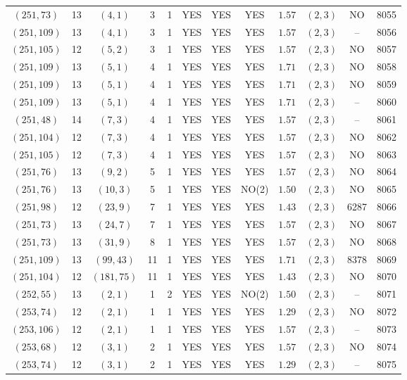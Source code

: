 \begin{longtable}{|c|c|c|c|c|c|c|c|c|c|c|c|}
$(251,73)$ & 13 & $(4,1)$ & 3 & 1 & YES & YES & YES & $1.57$ & $(2,3)$ & NO & 8055\\
$(251,109)$ & 13 & $(4,1)$ & 3 & 1 & YES & YES & YES & $1.57$ & $(2,3)$ & -- & 8056\\
$(251,105)$ & 12 & $(5,2)$ & 3 & 1 & YES & YES & YES & $1.57$ & $(2,3)$ & NO & 8057\\
$(251,109)$ & 13 & $(5,1)$ & 4 & 1 & YES & YES & YES & $1.71$ & $(2,3)$ & NO & 8058\\
$(251,109)$ & 13 & $(5,1)$ & 4 & 1 & YES & YES & YES & $1.71$ & $(2,3)$ & NO & 8059\\
$(251,109)$ & 13 & $(5,1)$ & 4 & 1 & YES & YES & YES & $1.71$ & $(2,3)$ & -- & 8060\\
$(251,48)$ & 14 & $(7,3)$ & 4 & 1 & YES & YES & YES & $1.57$ & $(2,3)$ & -- & 8061\\
$(251,104)$ & 12 & $(7,3)$ & 4 & 1 & YES & YES & YES & $1.57$ & $(2,3)$ & NO & 8062\\
$(251,105)$ & 12 & $(7,3)$ & 4 & 1 & YES & YES & YES & $1.57$ & $(2,3)$ & NO & 8063\\
$(251,76)$ & 13 & $(9,2)$ & 5 & 1 & YES & YES & YES & $1.57$ & $(2,3)$ & NO & 8064\\
$(251,76)$ & 13 & $(10,3)$ & 5 & 1 & YES & YES & NO(2) & $1.50$ & $(2,3)$ & NO & 8065\\
$(251,98)$ & 12 & $(23,9)$ & 7 & 1 & YES & YES & YES & $1.43$ & $(2,3)$ & 6287 & 8066\\
$(251,73)$ & 13 & $(24,7)$ & 7 & 1 & YES & YES & YES & $1.57$ & $(2,3)$ & NO & 8067\\
$(251,73)$ & 13 & $(31,9)$ & 8 & 1 & YES & YES & YES & $1.57$ & $(2,3)$ & NO & 8068\\
$(251,109)$ & 13 & $(99,43)$ & 11 & 1 & YES & YES & YES & $1.71$ & $(2,3)$ & 8378 & 8069\\
$(251,104)$ & 12 & $(181,75)$ & 11 & 1 & YES & YES & YES & $1.43$ & $(2,3)$ & NO & 8070\\
$(252,55)$ & 13 & $(2,1)$ & 1 & 2 & YES & YES & NO(2) & $1.50$ & $(2,3)$ & -- & 8071\\
$(253,74)$ & 12 & $(2,1)$ & 1 & 1 & YES & YES & YES & $1.29$ & $(2,3)$ & NO & 8072\\
$(253,106)$ & 12 & $(2,1)$ & 1 & 1 & YES & YES & YES & $1.57$ & $(2,3)$ & -- & 8073\\
$(253,68)$ & 12 & $(3,1)$ & 2 & 1 & YES & YES & YES & $1.57$ & $(2,3)$ & NO & 8074\\
$(253,74)$ & 12 & $(3,1)$ & 2 & 1 & YES & YES & YES & $1.29$ & $(2,3)$ & -- & 8075\\

\end{longtable}
